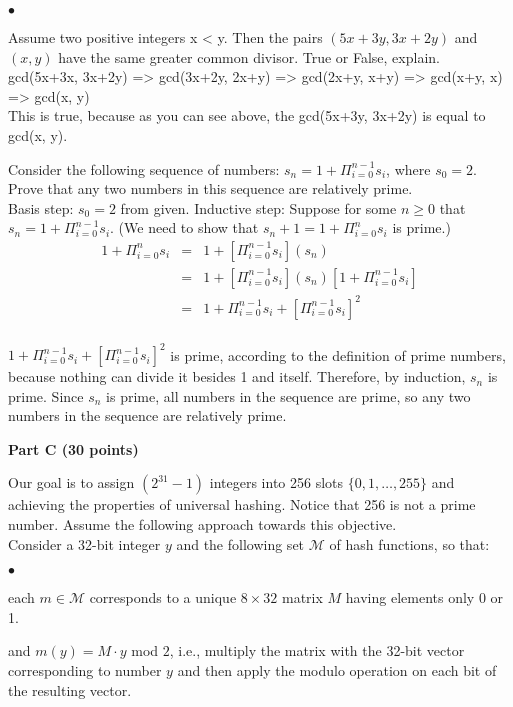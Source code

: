 \documentclass{article}
\newenvironment{myitem}{\begin{list}{$\bullet$}
{\setlength{\itemsep}{-0pt}
\setlength{\topsep}{0pt}
\setlength{\labelwidth}{0pt}
\setlength{\leftmargin}{10pt}
\setlength{\parsep}{-0pt}
\setlength{\itemsep}{0pt}
\setlength{\partopsep}{0pt}}}%
{\end{list}}
\begin{document}
\begin{myitem}
\item Assume two positive integers x < y. Then the pairs
  $(5x+3y,3x+2y)$ and $(x,y)$ have the same greater common
  divisor. True or False, explain.\\

gcd(5x+3x, 3x+2y) => gcd(3x+2y, 2x+y) => gcd(2x+y, x+y) => gcd(x+y, x) => gcd(x, y)\\
This is true, because as you can see above, the gcd(5x+3y, 3x+2y) is equal to gcd(x, y).\\

\item Consider the following sequence of numbers: $s_n = 1 +
  \Pi_{i=0}^{n-1} s_i$, where $s_0 = 2$. Prove that any two numbers in
  this sequence are relatively prime.\\

Basis step: $s_0=2$ from given.
Inductive step: Suppose for some $n \geq 0$ that $s_n=1+\Pi_{i=0}^{n-1} s_i$. (We need to show that $s_n+1=1+\Pi_{i=0}^{n}s_i$ is prime.)
\begin{eqnarray*}
	1+\Pi_{i=0}^{n} s_i &=& 1+[\Pi_{i=0}^{n-1} s_i](s_n)\\
	&=& 1+[\Pi_{i=0}^{n-1} s_i](s_n)[1+\Pi_{i=0}^{n-1} s_i]\\
	&=& 1+\Pi_{i=0}^{n-1} s_i+[\Pi_{i=0}^{n-1} s_i]^2\\
\end{eqnarray*}

$1+\Pi_{i=0}^{n-1} s_i+[\Pi_{i=0}^{n-1} s_i]^2$ is prime, according to the definition of prime numbers, because nothing can divide it besides 1 and itself. Therefore, by induction, $s_n$ is prime. Since $s_n$ is prime, all numbers in the sequence are prime, so any two numbers in the sequence are relatively prime.

\end{myitem}

\begin{center}
{\bf Part C (30 points)}
\end{center}

 Our goal is to assign $(2^{31}-1)$ integers
into 256 slots $\{0,1, \dots, 255\}$ and achieving the properties of
universal hashing. Notice that 256 is not a prime number. Assume the
following approach towards this objective.\\

\noindent Consider a 32-bit integer $y$ and the following set $\mathcal{M}$ of
hash functions, so that:
\begin{myitem}
\item each $m \in \mathcal{M}$ corresponds to a unique $8 \times 32$
  matrix $M$ having elements only 0 or 1.
\item and $m(y) = M \cdot y$ mod $2$, i.e., multiply the matrix with
  the 32-bit vector corresponding to number $y$ and then apply the
  modulo operation on each bit of the resulting vector.\\
\end{myitem}
\end{document}
